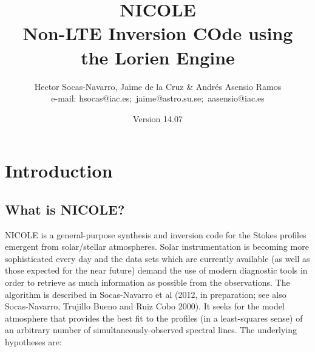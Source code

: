 

\title{NICOLE \\
Non-LTE Inversion COde using \\
the Lorien Engine}

\author{Hector Socas-Navarro,
    Jaime de la Cruz \& Andr\'es Asensio Ramos \\
%
e-mail: \mbox{hsocas@iac.es; jaime@astro.su.se; aasensio@iac.es}\\
}

\date{Version 14.07}

\maketitle


\tableofcontents



\chapter{Introduction}
\section{What is NICOLE?}

NICOLE is a general-purpose synthesis and inversion code for the
Stokes profiles emergent from solar/stellar atmospheres.  Solar
instrumentation is becoming more sophisticated every day and the data
sets which are currently available (as well as those expected for the
near future) demand the use of modern diagnostic tools in order to
retrieve as much information as possible from the observations.  The
algorithm is described in Socas-Navarro et al (2012, in preparation;
see also Socas-Navarro, Trujillo Bueno and Ruiz Cobo 2000). It seeks
for the model atmosphere that provides the best fit to the profiles
(in a least-squares sense) of an arbitrary number of
simultaneously-observed spectral lines.  The underlying hypotheses
are:

